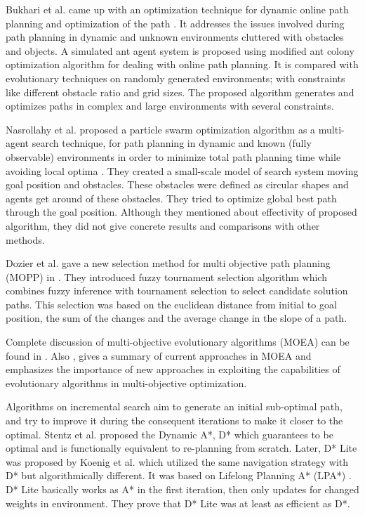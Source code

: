\documentclass[10pt,journal]{IEEEtran}
\begin{document}
Bukhari et al. came up with an optimization technique for dynamic online path planning and optimization of the path \cite{Bukhari:2010}. It addresses the issues involved during path planning in dynamic and unknown environments cluttered with obstacles and objects. A simulated ant agent system is proposed using modified ant colony optimization algorithm for dealing with online path planning. It is compared with evolutionary techniques on randomly generated environments; with constraints like different obstacle ratio and grid sizes. The proposed algorithm generates and optimizes paths in complex and large environments with several constraints.

Nasrollahy et al. proposed a particle swarm optimization algorithm as a multi-agent search technique, for path planning in dynamic and known (fully observable) environments in order to minimize total path planning time while avoiding local optima \cite{Nasrollahy:2009}. They created a small-scale model of search system moving goal position and obstacles. These obstacles were defined as circular shapes and agents get around of these obstacles. They tried to optimize global best path through the goal position. Although they mentioned about effectivity of proposed algorithm, they did not give concrete results and comparisons with other methods.

Dozier et al. gave a new selection method for multi objective path planning (MOPP) in \cite{Dozier:1998}. They introduced fuzzy tournament selection algorithm which combines fuzzy inference with tournament selection to select candidate solution paths. This selection was based on the euclidean distance from initial to goal position, the sum of the changes and the average change in the slope of a path.

Complete discussion of multi-objective evolutionary algorithms (MOEA) can be found in \cite{MOOUEA}. Also \cite{Coello:2000}, gives a summary of current approaches in MOEA and emphasizes the importance of new approaches in exploiting the capabilities of evolutionary algorithms in multi-objective optimization.

Algorithms on incremental search aim to generate an initial sub-optimal path, and try to improve it during the consequent iterations to make it closer to the optimal. Stentz et al. proposed the Dynamic A*, D* \cite{DStar:1994} which guarantees to be optimal and is functionally equivalent to re-planning from scratch. Later, D* Lite was proposed by Koenig et al. \cite{Koenig:2002} which utilized the same navigation strategy with D* but algorithmically different. It was based on Lifelong Planning A* (LPA*) \cite{LPAStarKoenig:2004}. D* Lite basically works as A* in the first iteration, then only updates for changed weights in environment. They prove that D* Lite was at least as efficient as D*.
\end{document}
